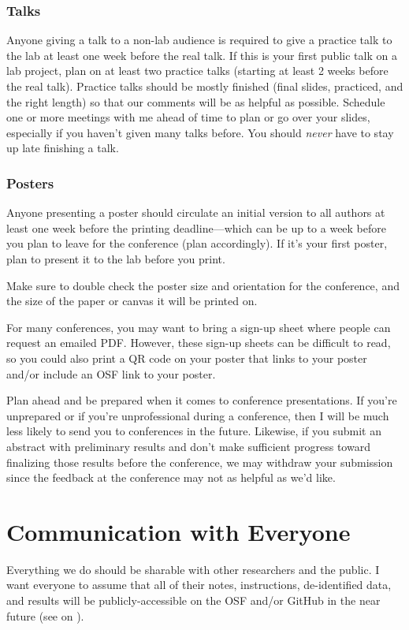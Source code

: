\documentclass[letterpaper,11pt,oneside]{memoir}
\begin{document}
\subsubsection{Talks}
Anyone giving a talk to a non-lab audience is required to give a practice talk to the lab at least one week before the real talk. If this is your first public talk on a lab project, plan on at least two practice talks (starting at least 2 weeks before the real talk). Practice talks should be mostly finished (final slides, practiced, and the right length) so that our comments will be as helpful as possible. Schedule one or more meetings with me ahead of time to plan or go over your slides, especially if you haven't given many talks before. You should \textit{never} have to stay up late finishing a talk.

\subsubsection{Posters}
Anyone presenting a poster should circulate an initial version to all authors at least one week before the printing deadline---which can be up to a week before you plan to leave for the conference (plan accordingly). If it's your first poster, plan to present it to the lab before you print. 

Make sure to double check the poster size and orientation for the conference, and the size of the paper or canvas it will be printed on.

For many conferences, you may want to bring a sign-up sheet where people can request an emailed PDF. However, these sign-up sheets can be difficult to read, so you could also print a QR code on your poster that links to your poster and/or include an OSF link to your poster.

\begin{shaded}
\noindent Plan ahead and be prepared when it comes to conference presentations. If you're unprepared or if you're unprofessional during a conference, then I will be much less likely to send you to conferences in the future. Likewise, if you submit an abstract with preliminary results and don't make sufficient progress toward finalizing those results before the conference, we may withdraw your submission since the feedback at the conference may not as helpful as we'd like.
\end{shaded}


\section{Communication with Everyone}
Everything we do should be sharable with other researchers and the public. I want everyone to assume that all of their notes, instructions, de-identified data, and results will be publicly-accessible on the OSF and/or GitHub in the near future (see  on ). 
\end{document}
